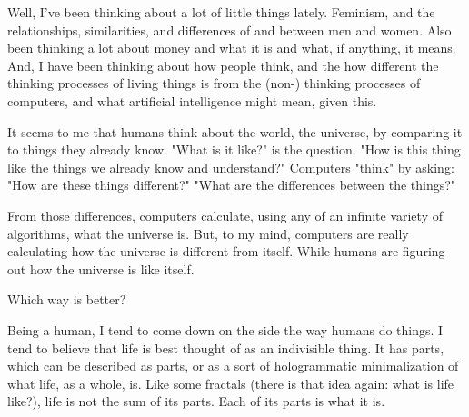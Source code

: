 Well, I've been thinking about a lot of little things lately. Feminism, and the relationships, similarities, and differences of and between men and women.  Also been thinking a lot about money and what it is and what, if anything, it means. And, I have been thinking about how people think, and the how different the thinking processes of living things is from the (non-) thinking processes of computers, and what artificial intelligence might mean, given this.  

It seems to me that humans think about the world, the universe, by comparing it to things they already know.  "What is it like?" is the question. "How is this thing like the things we already know and understand?" Computers "think" by asking: "How are these things different?" "What are the differences between the things?"

From those differences, computers calculate, using any of an infinite variety of algorithms, what the universe is. But, to my mind, computers are really calculating how the universe is different from itself. While humans are figuring out how the universe is like itself.

Which way is better?

Being a human, I tend to come down on the side the way humans do things. I tend to believe that life is best thought of as an indivisible thing. It has parts, which can be described as parts, or as a sort of hologrammatic minimalization of what life, as a whole, is.  Like some fractals (there is that idea again: what is life like?), life is not the sum of its parts. Each of its parts is what it is.
